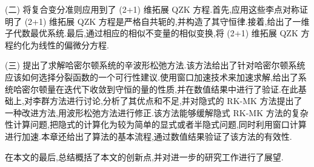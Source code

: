 (二) 将复合变分准则应用到了 (2+1) 维拓展 QZK 方程.首先,应用这些李点对称证明了 (2+1) 维拓展 QZK 方程是严格自共轭的,并构造了其守恒律.接着,给出了一维子代数最优系统.最后,通过相应的相似不变量的相似变换,将 (2+1) 维拓展 QZK 方程约化为线性的偏微分方程.

(三) 提出了求解哈密尔顿系统的辛波形松弛方法.该方法给出了针对哈密尔顿系统应该如何选择分裂函数的一个可行性建议.使用窗口加速技术来加速求解,给出了系统哈密尔顿量在迭代下收敛到守恒的量的性质,并在数值结果中进行了验证.在此基础上,对李群方法进行讨论,分析了其优点和不足,并对隐式的 RK-MK 方法提出了一种改进方法,用波形松弛方法进行修正.该方法能够缓解隐式 RK-MK 方法的复杂性计算问题,把隐式的计算化为较为简单的显式或者半隐式问题,同时利用窗口计算进行加速.本章还给出了算法的基本流程,通过数值结果验证了该方法的有效性.

在本文的最后,总结概括了本文的创新点,并对进一步的研究工作进行了展望.
